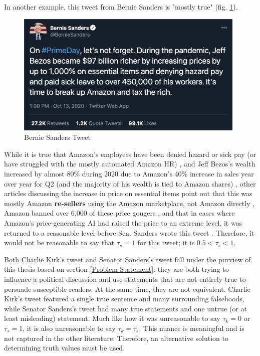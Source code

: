 \documentclass[preprint,review,12pt]{elsarticle}
\begin{document}
In another example, this tweet from Bernie Sanders is "mostly true" (fig. \ref{fig:Bernie Sanders Tweet, Oct 13, 2020}). 
 \begin{figure}[h]
    \centering
    \includegraphics[width=11cm]{BernieTweet.png}
    \caption{Bernie Sanders Tweet \cite{sanders2020tweet}}
    \label{fig:Bernie Sanders Tweet, Oct 13, 2020}
\end{figure}
While it is true that Amazon's employees have been denied hazard or sick pay (or have struggled with the mostly automated Amazon HR) \cite{cnbc2020amazon,guardian2020amazon}, and Jeff Bezos's wealth increased by almost 80\% during 2020 due to Amazon's 40\% increase in sales year over year for Q2 (and the majority of his wealth is tied to Amazon shares) \cite{Stebbins2020bezos}, other articles discussing the increase in price on essential items point out that this was mostly Amazon \textbf{re-sellers} using the Amazon marketplace, not Amazon directly \cite{nicas2020sanitizer, kim2020price,gibson2020amazon}, Amazon banned over 6,000 of these price gougers \cite{bezos2020letter}, and that in cases where Amazon's price-generating AI had raised the price to an extreme level, it was returned to a reasonable level before Sen. Sanders wrote this tweet \cite{harman2020prime}. Therefore, it would not be reasonable to say that $\tau_s = 1$ for this tweet; it is $ 0.5 < \tau_s < 1$. 

Both Charlie Kirk's tweet and Senator Sanders's tweet fall under the purview of this thesis based on section \ref{Problem Statement}: they are both trying to influence a political discussion and use statements that are not entirely true to persuade susceptible readers. At the same time, they are not equivalent. Charlie Kirk's tweet featured a single true sentence and many surrounding falsehoods, while Senator Sanders's tweet had many true statements and one untrue (or at least misleading) statement. Much like how it was unreasonable to say $\tau_k = 0$ or $\tau_s = 1$, it is also unreasonable to say $\tau_k = \tau_s$. This nuance is meaningful and is not captured in the other literature. Therefore, an alternative solution to determining truth values must be used.
\end{document}
